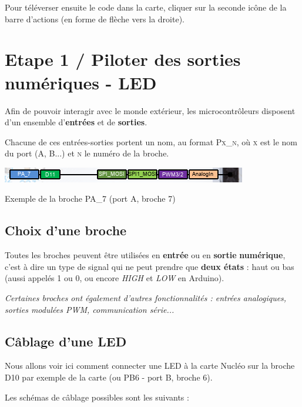 \documentclass[a4paper,11pt,titlepage]{article} %
\begin{document}
Pour téléverser ensuite le code dans la carte, cliquer sur la seconde icône de la barre d'actions (en forme de flèche vers la droite).



\cleardoublepage
\section{Etape 1 / Piloter des sorties numériques - LED}

Afin de pouvoir interagir avec le monde extérieur, les microcontrôleurs disposent d'un ensemble d'\textbf{entrées} et de \textbf{sorties}. 

Chacune de ces entrées-sorties portent un nom, au format \textsc{Px\_n}, où \textsc{x} est le nom du port (A, B...) et \textsc{n} le numéro de la broche.

\begin{center}
	\includegraphics{images/nucleo_pin_functions.png}
	
	Exemple de la broche PA\_7 (port A, broche 7)
\end{center}


\subsection{Choix d'une broche}

Toutes les broches peuvent être utilisées en \textbf{entrée} ou en \textbf{sortie} \textbf{numérique}, c'est à dire un type de signal qui ne peut prendre que \textbf{deux états} : haut ou bas (aussi appelés 1 ou 0, ou encore \textit{HIGH} et \textit{LOW} en Arduino). 

\textit{Certaines broches ont également d'autres fonctionnalités : entrées analogiques, sorties modulées PWM, communication série...}


\subsection{Câblage d'une LED}

Nous allons voir ici comment connecter une LED à la carte Nucléo sur la broche D10 par exemple de la carte (ou PB6 - port B, broche 6).

Les schémas de câblage possibles sont les suivants :
\end{document}
